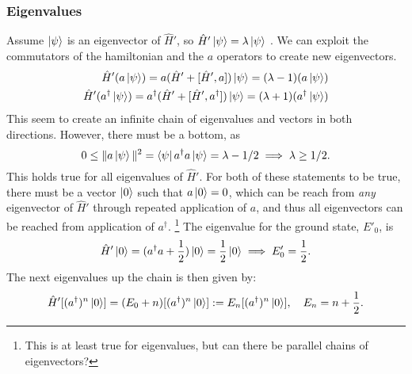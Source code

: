 \subsubsection*{Eigenvalues}
Assume $\ket{\psi}$ is an eigenvector of $\hat H'$, so $\hat H' \ket{\psi} = \lambda \ket{\psi}$ .
We can exploit the commutators of the hamiltonian and the $a$ operators to create new eigenvectors.
\begin{align*}
    \hat H'(a\ket{\psi}) = a(\hat H' + [\hat H', a])\ket{\psi} = (\lambda - 1)(a\ket{\psi}) \\ 
    \hat H'(a^\dagger\ket{\psi}) = a^\dagger(\hat H' + [\hat H', a^\dagger])\ket{\psi} = (\lambda + 1)(a^\dagger \ket{\psi})
\end{align*}
This seem to create an infinite chain of eigenvalues and vectors in both directions. However, there must be a bottom, as
\begin{equation*}
    0 \leq \| a\ket{\psi} \|^2 = \bra{\psi}a^\dagger a \ket{\psi} = \lambda - 1/2 \implies \lambda \geq 1/2.
\end{equation*} 
This holds true for all eigenvalues of $\hat H'$. For both of these statements to be true, there must be a vector $\ket{0}$ such that $a \ket{0} = 0$, which can be reach from \emph{any} eigenvector of $\hat H'$ through repeated application of $a$, and thus all eigenvectors can be reached from application of $a^\dagger$. \footnote{This is at least true for eigenvalues, but can there be parallel chains of eigenvectors?} The eigenvalue for the ground state, $E'_0$, is
\begin{equation*}
    \hat H' \ket{0} = (a^\dagger a + \frac{1}{2}) \ket{0} = \frac{1}{2} \ket{0} \implies E'_0 = \frac{1}{2}.
\end{equation*}
The next eigenvalues up the chain is then given by:
\begin{equation}
    \label{eigenvalues harmonic oscillator}
    \hat H' [(a^\dagger)^n \ket{0}] = (E_0 + n)[(a^\dagger)^n \ket{0}]:= E_n [(a^\dagger)^n \ket{0}], \quad E_n = n + \frac{1}{2}.
\end{equation}

